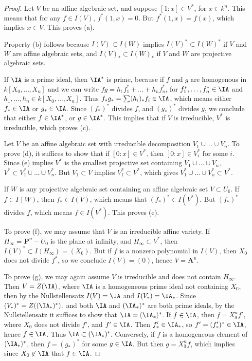 \begin{proof}
    Let $V$ be an affine algebraic set, and suppose $[1:x] \in V^*$, for $x \in k^n$. This means that for any $f \in I(V)$, $f^*(1,x) = 0$. But $f^*(1,x) = f(x)$, which implies $x \in V$. This proves (a).

    Property (b) follows because $I(V) \subset I(W)$ implies $I(V)^* \subset I(W)^*$ if $V$ and $W$ are affine algebraic sets, and $I(V)_* \subset I(W)_*$ if $V$ and $W$ are projective algebraic sets.

    If $\IA$ is a prime ideal, then $\IA^*$ is prime, because if $f$ and $g$ are homogenous in $k[X_0,\dots,X_n]$ and we can write $fg = h_1f_1^* + \dots + h_nf_n^*$, for $f_1^*,\dots,f_n^* \in \IA$ and $h_1,\dots,h_n \in k[X_0,\dots,X_n]$. Thus $f_* g_* = \sum (h_i)_* f_i \in \IA$, which means either $f_* \in \IA$ or $g_* \in \IA$. Since $(f_*)^*$ divides $f$, and $(g_*)^*$ divides $g$, we conclude that either $f \in \IA^*$, or $g \in \IA^*$. This implies that if $V$ is irreducible, $V^*$ is irreducible, which proves (c).

    Let $V$ be an affine algebraic set with irreducible decomposition $V_1 \cup \dots \cup V_n$. To prove (d), it suffices to show that if $[0:x] \in V^*$, then $[0:x] \in V_i^*$ for some $i$. Since (e) implies $V^*$ is the smallest projective set containing $V_1 \cup \dots \cup V_n$, $V^* \subset V_1^* \cup \dots \cup V_n^*$. But $V_1 \subset V$ implies $V_1^* \subset V^*$, which gives $V_1^* \cup \dots \cup V_n^* \subset V^*$.

    If $W$ is any projective algebraic set containing an affine algebraic set $V \subset U_0$. If $f \in I(W)$, then $f_* \in I(V)$, which means that $(f_*)^* \in I(V^*)$. But $(f_*)^*$ divides $f$, which means $f \in I(V^*)$. This proves (e).

    To prove (f), we may assume that $V$ is an irreducible affine variety. If $H_\infty = \mathbf{P}^n - U_0$ is the plane at infinity, and $H_\infty \subset V^*$, then $I(V)^* \subset I(H_\infty) = (X_0)$. But if $f$ is a nonzero polynomial in $I(V)$, then $X_0$ does not divide $f^*$, so we conclude $I(V) = (0)$, hence $V = \mathbf{A}^n$.

    To prove (g), we may again assume $V$ is irreducible and does not contain $H_\infty$. Then $V = Z(\IA)$, where $\IA$ is a homogeneous prime ideal not containing $X_0$, then by the Nullstellensatz $I(V) = \IA$ and $I(V_*) = \IA_*$. Since $(V_*)^* = Z((\IA_*)^*)$, and both $\IA$ and $(\IA_*)^*$ are both prime ideals, by the Nullstellensatz it suffices to show that $\IA = (\IA_*)^*$. If $f \in \IA$, then $f = X_0^n f'$, where $X_0$ does not divide $f'$, and $f' \in \IA$. Then $f'_* \in \IA_*$, so $f' = (f'_*)^* \in \IA$, hence $f \in \IA$. Thus $\IA \subset (\IA_*)^*$. Conversely, if $f$ is a homogeneous element of $(\IA_*)^*$, then $f = (g_*)^*$ for some $g \in \IA$. But then $g = X_0^n f$, which implies since $X_0 \not \in \IA$ that $f \in \IA$.
\end{proof}

